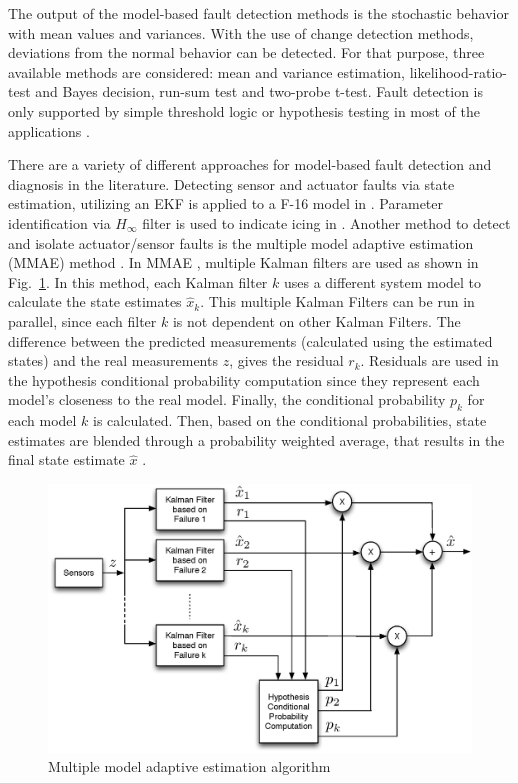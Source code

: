 The output of the model-based fault detection methods is the stochastic behavior 
with mean values and variances. With the use of change detection methods, deviations 
from the normal behavior can be detected. For that purpose, three available methods are considered: mean and variance estimation, likelihood-ratio-test and Bayes decision, 
run-sum test and two-probe t-test. Fault detection is only supported by simple threshold 
logic or hypothesis testing in most of the applications \cite{isermann1997trends}.

There are a variety of different approaches for model-based fault detection and diagnosis in the literature.
Detecting sensor and actuator faults via state estimation, utilizing an EKF is applied to a 
F-16 model in \cite{hajiyev2005sensor}. Parameter identification via $H_{\infty}$ filter 
is used to indicate icing in \cite{melody2001h}.
Another method to detect and isolate actuator/sensor faults is the multiple model adaptive estimation (MMAE) method \cite{ducard2009fault}. In MMAE \cite{magill1965optimal}, multiple Kalman filters are used as shown in Fig.~\ref{fig:mmaeScheme}. In this method, each Kalman filter $k$ uses a different system model to calculate the state estimates $\hat{x}_k$. This multiple Kalman Filters can be run in parallel, since each filter $k$ is not dependent on other Kalman Filters. The difference between the predicted measurements (calculated using the estimated states) and the real measurements $z$, gives the residual $r_k$. Residuals are used in the hypothesis conditional probability computation since they represent each model's closeness to the real model. Finally, the conditional probability $p_k$ for each model $k$ is calculated. Then, based on the conditional probabilities, state estimates are blended through a probability weighted average, that results in the final state estimate  $\hat{x}$ \cite{miller1998modified}.

\begin{figure}
\begin{center}
\includegraphics[width=14.7cm]{figures/mmaeScheme}
\caption{Multiple model adaptive estimation algorithm \cite{miller1998modified}} 
\label{fig:mmaeScheme}
\end{center}
\end{figure}

